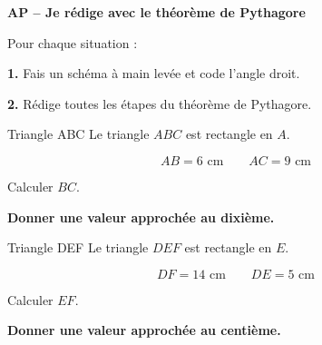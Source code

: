 \documentclass[11pt,a4paper]{article}
\begin{document}

\begin{center}
{\sffamily\LARGE\bfseries\color{TitreC}
AP -- Je rédige avec le théorème de Pythagore}
\end{center}

\vspace{1mm}

\begin{tcolorbox}[
  enhanced,
  colback=SavoirBg,
  colframe=SavoirC!50,
  boxrule=0.6pt,
  arc=1.5mm,
  left=4mm,
  right=4mm,
  top=2mm,
  bottom=2mm
]

Pour chaque situation :

\medskip

\textbf{1.} Fais un schéma à main levée et code l'angle droit.

\textbf{2.} Rédige toutes les étapes du théorème de Pythagore.

\end{tcolorbox}

\vspace{3mm}


\noindent
\begin{minipage}[t]{0.485\linewidth}

\begin{exercicebox}{Triangle ABC}
Le triangle \(ABC\) est rectangle en \(A\).

\[
AB=6\text{ cm}
\qquad
AC=9\text{ cm}
\]

Calculer \(BC\).

\textbf{Donner une valeur approchée au dixième.}
\end{exercicebox}

\end{minipage}
\hfill
\begin{minipage}[t]{0.485\linewidth}

\begin{exercicebox}{Triangle DEF}
Le triangle \(DEF\) est rectangle en \(E\).

\[
DF=14\text{ cm}
\qquad
DE=5\text{ cm}
\]

Calculer \(EF\).

\textbf{Donner une valeur approchée au centième.}
\end{exercicebox}

\end{minipage}
\end{document}

